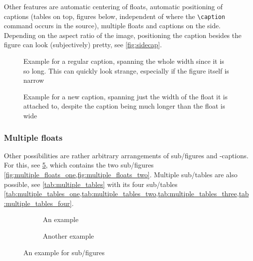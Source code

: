 \begin{description}
          Other features are automatic centering of floats, automatic positioning
          of captions (tables on top, figures below, independent of where the
          \verb|\caption| command occurs in the source), multiple floats and
          captions on the side.
          Depending on the aspect ratio of the image, positioning the caption besides
          the figure can look (subjectively) pretty, see \cref{fig:sidecap}.
\end{description}

\begin{figure}[tbp]
    \ContinuedFloat*%
    \centering
    
    \captionsetup{width=\linewidth}
    \caption{%
        Example for a regular caption,
        spanning the whole width since it is so long.
        This can quickly look strange, especially if the figure itself is narrow%
    }
    \label{fig:wide_caption}
\end{figure}

\begin{figure}[tbp]
    \ContinuedFloat
    \centering
    
    \captionsetup{width=0.45\linewidth}
    \caption{%
        Example for a new caption, spanning just the width of the float
        it is attached to, despite the caption being much longer than the
        float is wide%
    }
    \label{fig:tighter_caption}
\end{figure}

\subsubsection{Multiple floats}

Other possibilities are rather arbitrary arrangements of sub\-/figures and -captions.
For this, see \cref{fig:multiple_floats}, which contains the two sub\-/figures
\cref{fig:multiple_floats_one,fig:multiple_floats_two}.
Multiple sub\-/tables are also possible, see \cref{tab:multiple_tables} with its four
sub\-/tables
\cref{tab:multiple_tables_one,tab:multiple_tables_two,tab:multiple_tables_three,tab:multiple_tables_four}.

\begin{figure}[tbp]

    \begin{subfigure}[t]{0.48\linewidth}
        \centering
        
        \caption{An example}
        \label{fig:multiple_floats_one}
    \end{subfigure}
    \hfill
    \begin{subfigure}[t]{0.48\linewidth}
        \centering
        
        \caption{Another example}
        \label{fig:multiple_floats_two}
    \end{subfigure}
    \caption{An example for sub\-/figures}
    \label{fig:multiple_floats}
\end{figure}

